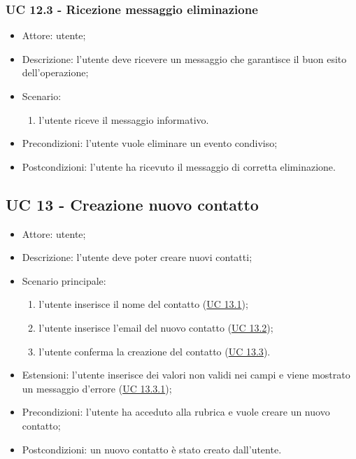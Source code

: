 \subsubsection{UC 12.3 - Ricezione messaggio eliminazione} \label{sec: UC 12.3}
\begin{itemize}
    \item Attore: utente;
    \item Descrizione: l'utente deve ricevere un messaggio che garantisce il buon esito dell'operazione;
    \item Scenario:
        \begin{enumerate}
        \item l'utente riceve il messaggio informativo.
        \end{enumerate}
    
    \item Precondizioni: l'utente vuole eliminare un evento condiviso;
    \item Postcondizioni: l'utente ha ricevuto il messaggio di corretta eliminazione.
\end{itemize}




\subsection{UC 13 - Creazione nuovo contatto}
\begin{itemize}
    \item Attore: utente;
    \item Descrizione: l'utente deve poter creare nuovi contatti;
    \item Scenario principale:
        \begin{enumerate}
        \item l'utente inserisce il nome del contatto (\hyperref[sec: UC 13.1]{UC 13.1});
        \item l'utente inserisce l'email del nuovo contatto (\hyperref[sec: UC 13.2]{UC 13.2});
        \item l'utente conferma la creazione del contatto (\hyperref[sec: UC 13.3]{UC 13.3}).
        \end{enumerate}
    \item Estensioni: l'utente inserisce dei valori non validi nei campi e viene mostrato un messaggio d'errore (\hyperref[sec: UC 13.3.1]{UC 13.3.1});
    \item Precondizioni: l'utente ha acceduto alla rubrica e vuole creare un nuovo contatto;
    \item Postcondizioni: un nuovo contatto è stato creato dall'utente.
\end{itemize}


